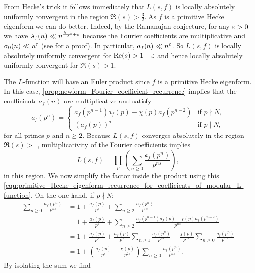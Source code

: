       From Hecke's trick it follows immediately that $L(s,f)$ is locally absolutely uniformly convergent in the region $\Re(s) > \frac{3}{2}$. As $f$ is a primitive Hecke eigenform we can do better. Indeed, by the Ramanujan conjecture, for any $\varepsilon > 0$ we have $\lambda_{f}(n) \ll n^{\frac{k-1}{2}+\varepsilon}$ because the Fourier coefficients are multiplicative and $\sigma_{0}(n) \ll n^{\varepsilon}$ (see \cite{montgomery2006multiplicative} for a proof). In particular, $a_{f}(n) \ll n^{\varepsilon}$. So $L(s,f)$ is locally absolutely uniformly convergent for $\mathrm{Re}(s) > 1+\varepsilon$ and hence locally absolutely uniformly convergent for $\Re(s) > 1$.

      The $L$-function will have an Euler product since $f$ is a primitive Hecke eigenform. In this case, \cref{prop:newform_Fourier_coefficient_recurrence} implies that the coefficients $a_{f}(n)$ are multiplicative and satisfy
      \begin{equation}\label{equ:primitive_Hecke_eigenform_recurrence_for_coefficients_of_modular_L-function}
        a_{f}(p^{n}) = \begin{cases} a_{f}(p^{n-1})a_{f}(p)-\chi(p)a_{f}(p^{n-2}) & \text{if $p \nmid N$}, \\ (a_{f}(p))^{n} & \text{if $p \mid N$}, \end{cases}
      \end{equation}
      for all primes $p$ and $n \ge 2$. Because $L(s,f)$ converges absolutely in the region $\Re(s) > 1$, multiplicativity of the Fourier coefficients implies
      \[
        L(s,f) = \prod_{p}\left(\sum_{n \ge 0}\frac{a_{f}(p^{n})}{p^{ns}}\right),
      \]
      in this region. We now simplify the factor inside the product using this \cref{equ:primitive_Hecke_eigenform_recurrence_for_coefficients_of_modular_L-function}. On the one hand, if $p \nmid N$:
      \begin{align*}
        \sum_{n \ge 0}\frac{a_{f}(p^{n})}{p^{ns}} &= 1+\frac{a_{f}(p)}{p^{s}}+\sum_{n \ge 2}\frac{a_{f}(p^{n})}{p^{ns}} \\
        &= 1+\frac{a_{f}(p)}{p^{s}}+\sum_{n \ge 2}\frac{a_{f}(p^{n-1})a_{f}(p)-\chi(p)a_{f}(p^{n-2})}{p^{ns}} \\
        &= 1+\frac{a_{f}(p)}{p^{s}}+\frac{a_{f}(p)}{p^{s}}\sum_{n \ge 1}\frac{a_{f}(p^{n})}{p^{ns}}-\frac{\chi(p)}{p^{2s}}\sum_{n \ge 0}\frac{a_{f}(p^{n})}{p^{ns}} \\
        &= 1+\left(\frac{a_{f}(p)}{p^{s}}-\frac{\chi(p)}{p^{2s}}\right)\sum_{n \ge 0}\frac{a_{f}(p^{n})}{p^{ns}}.
      \end{align*}
      By isolating the sum we find
